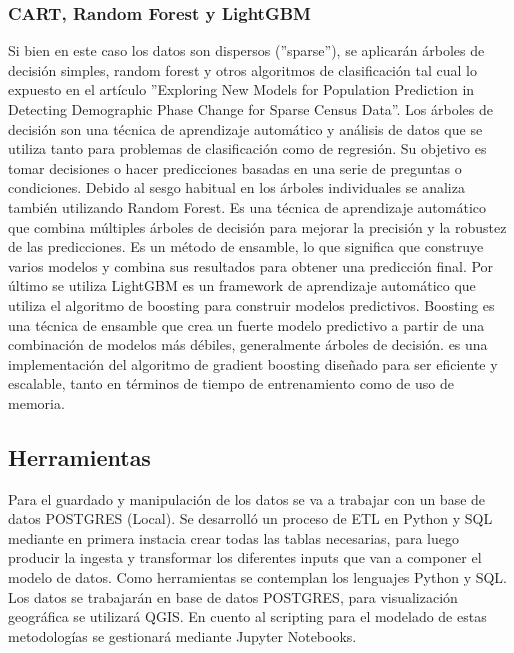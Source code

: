 \documentclass{article}
\theoremstyle{mytheoremstyle}
\theoremstyle{mytheoremstyle}
\theoremstyle{myproblemstyle}
\begin{document}
\subsubsection{CART, Random Forest  y LightGBM}
 Si bien en este caso los datos son dispersos (''sparse''), se aplicarán árboles de decisión simples, random forest y otros algoritmos de clasificación
 tal cual lo expuesto en el artículo ''Exploring New Models for Population Prediction in Detecting Demographic
  Phase Change for Sparse Census Data''. \newline
  Los árboles de decisión son una técnica de aprendizaje automático y análisis de datos que se utiliza tanto
   para problemas de clasificación como de regresión. Su objetivo es tomar decisiones o
  hacer predicciones basadas en una serie de preguntas o condiciones. Debido al sesgo habitual en los árboles 
  individuales se analiza también utilizando Random Forest. Es una técnica de aprendizaje automático que combina
   múltiples árboles de  decisión para mejorar la precisión y la robustez de las predicciones. Es un método de ensamble, lo 
  que significa que construye varios modelos y combina sus resultados para obtener una predicción final.\newline
  Por último se utiliza LightGBM es un framework de aprendizaje automático que utiliza el algoritmo de 
  boosting para construir modelos predictivos. Boosting es una técnica de ensamble que crea un fuerte modelo 
  predictivo a partir de una combinación de modelos más débiles, generalmente árboles de decisión. 
  es una implementación del algoritmo de gradient boosting diseñado para ser eficiente y escalable,
   tanto en términos de tiempo de entrenamiento como de uso de memoria.
 
\subsection{Herramientas }
Para el guardado y manipulación de los datos se va a trabajar con un base de datos POSTGRES (Local). 
Se desarrolló un proceso de ETL en Python y SQL mediante en primera instacia crear todas las tablas necesarias, 
para luego producir la ingesta y transformar los diferentes inputs que van a componer
 el modelo de datos.\newline
Como herramientas se contemplan los lenguajes Python y SQL. Los datos se trabajarán en base de datos POSTGRES,
 para visualización geográfica se utilizará QGIS. En cuento al scripting para el modelado de estas metodologías
 se gestionará mediante Jupyter Notebooks.
\end{document}
